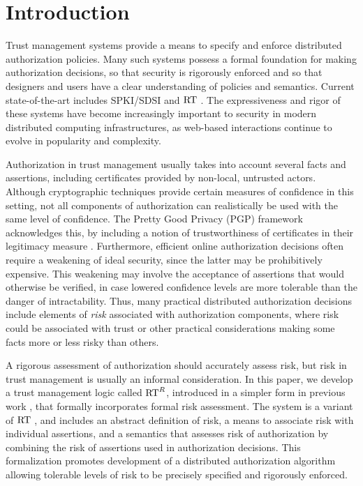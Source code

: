 \section{Introduction}

Trust management systems provide a means to specify and enforce
distributed authorization policies.  Many such systems possess a
formal foundation for making authorization decisions, so that security
is rigorously enforced and so that designers and users have a clear
understanding of policies and semantics.  Current state-of-the-art
includes SPKI/SDSI \cite{rivest-lampson-96,ellison-etal-rfc99} and
$\text{RT}$ \cite{Li:2003-04}.  The expressiveness and rigor of these
systems have become increasingly important to security in modern
distributed computing infrastructures, as web-based interactions
continue to evolve in popularity and complexity.

Authorization in trust management usually takes into account several
facts and assertions, including certificates provided by non-local,
untrusted actors.  Although cryptographic techniques provide certain
measures of confidence in this setting, not all components of
authorization can realistically be used with the same level of
confidence.  The Pretty Good Privacy (PGP) framework acknowledges
this, by including a notion of trustworthiness of certificates in
their legitimacy measure \cite{Abdul-Rahman-EDI97}.  Furthermore,
efficient online authorization decisions often require a weakening of
ideal security, since the latter may be prohibitively expensive.  This
weakening may involve the acceptance of assertions that would
otherwise be verified, in case lowered confidence levels are more
tolerable than the danger of intractability.  Thus, many practical
distributed authorization decisions include elements of \emph{risk}
associated with authorization components, where risk could be
associated with trust or other practical considerations making some
facts more or less risky than others.

A rigorous assessment of authorization should accurately assess risk,
but risk in trust management is usually an informal consideration.  In
this paper, we develop a trust management logic called $\text{RT}^R$,
introduced in a simpler form in previous work
\cite{chapin-skalka-wang-fmse05}, that formally incorporates formal
risk assessment.  The system is a variant of $\text{RT}$ \cite{Li:2003-04},
and includes an abstract definition of risk, a means to associate risk
with individual assertions, and a semantics that assesses risk of
authorization by combining the risk of assertions used in
authorization decisions.  This formalization promotes development of a
distributed authorization algorithm allowing tolerable levels of risk
to be precisely specified and rigorously enforced.

